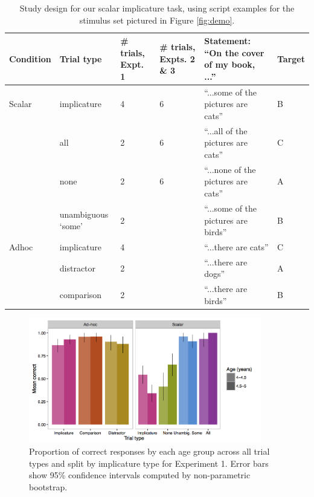 \documentclass[man]{apa2}
\begin{document}
 \begin{table}
 \footnotesize
 \centering
     \begin{tabular}{C{1.5cm} C{2cm} C{1.5cm} C{1.5cm} C{4.5cm} C{1.5cm}}
                      \hline
       \null   Condition  & Trial type & \# trials, Expt. 1 & \# trials, Expts. 2 \& 3 & Statement: ``On the cover of my book, ...'' & Target   \\
       \hline
            Scalar & implicature & 4 & 6 &  ``...some of the pictures are cats'' & B	 \\
          & all  & 2 &  6 & ``...all of the pictures are cats'' & C		                 \\
           & none  & 2 & 6 & ``...none of the pictures are cats'' & A			\\
               & unambiguous `some' 	&  2 &  & ``...some of the pictures are birds'' & B					        \\
	\hline
	    Adhoc       & implicature & 4 &  & ``...there are cats'' & C 		\\
	     & distractor & 2 &  & ``...there are dogs'' & A	     \\
          & comparison & 2 &  & ``...there are birds'' & B 	   \\
       \hline
     \end{tabular}
     \caption{Study design for our scalar implicature task, using script examples for the stimulus set pictured in Figure \ref{fig:demo}. \label{tab:scripts} }
 \end{table}

 \begin{figure}
 \begin{center}
  \includegraphics[width=4in]{figures/exp1_performance.png}
  \caption{\label{fig:exp1_perf} Proportion of correct responses by each age group across all trial types and split by implicature type for Experiment 1. Error bars show 95\% confidence intervals computed by non-parametric bootstrap.}
 \end{center}
\end{figure}
\end{document}
